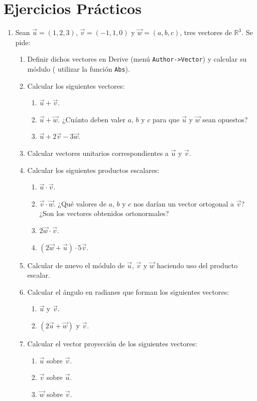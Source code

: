 \documentclass[a4paper]{article}
\begin{document}
\section*{Ejercicios Prácticos}
\begin{enumerate}[leftmargin=*]
\item Sean $\vec{u}=(1,2,3)$, $\vec{v}=(-1,1,0)$ y $\vec{w}=(a,b,c)$, tres
vectores de $\mathbb{R}^3$. Se pide:
\begin{enumerate}
\item Definir dichos vectores en Derive (menú \texttt{Author->Vector}) y calcular su
módulo ( utilizar la función \texttt{Abs}).
\item Calcular los siguientes vectores:
\begin{enumerate}
\item $\vec{u}+\vec{v}$.
\item $\vec{u}+\vec{w}$. ¿Cuánto deben valer $a$, $b$ y $c$ para que $\vec{u}$
y $\vec{w}$ sean opuestos?
\item $\vec{u}+2\vec{v}-3\vec{w}$.
\end{enumerate}
\item Calcular vectores unitarios correspondientes a $\vec{u}$ y $\vec{v}$.
\item Calcular los siguientes productos escalares:
\begin{enumerate}
\item $\vec{u}\cdot\vec{v}$.
\item $\vec{v}\cdot\vec{w}$. ¿Qué valores de $a$, $b$ y $c$ nos darían un
vector ortogonal a $\vec{v}$? ¿Son los vectores obtenidos ortonormales?
\item $2\vec{w}\cdot\vec{v}$.
\item $(2\vec{w}+\vec{u})\cdot 5\vec{v}$.
\end{enumerate}
\item Calcular de nuevo el módulo de $\vec{u}$, $\vec{v}$ y $\vec{w}$ haciendo
uso del producto escalar.

\item Calcular el ángulo en radianes que forman los siguientes vectores:
\begin{enumerate}
\item $\vec{u}$ y $\vec{v}$.
\item $(2\vec{u}+\vec{w})$ y $\vec{v}$.
\end{enumerate}

\item Calcular el vector proyección de los siguientes vectores:
\begin{enumerate}
\item $\vec{u}$ sobre $\vec{v}$.
\item $\vec{v}$ sobre $\vec{u}$.
\item $\vec{w}$ sobre $\vec{v}$.
\end{enumerate}


\end{enumerate}
\end{enumerate}
\end{document}
